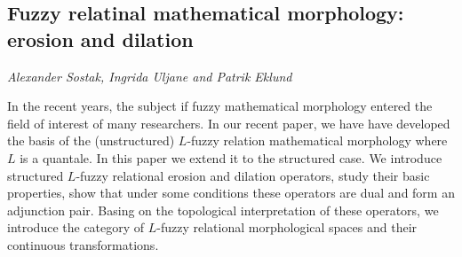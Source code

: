 \documentclass[../booklet.tex]{subfiles}
\begin{document}
\subsection[Fuzzy relatinal mathematical morphology: erosion and dilation. {\it Alexander Sostak, Ingrida Uljane and Patrik Eklund}]{Fuzzy relatinal mathematical morphology: erosion and dilation}
  

\begin{center}
  {\it Alexander Sostak, Ingrida Uljane and Patrik Eklund}
\end{center}

\vskip 0.8cm

 In the recent years, the subject if fuzzy mathematical morphology entered the field of interest of many researchers. In our recent paper, we have have developed the basis of the (unstructured) $L$-fuzzy relation mathematical morphology where $L$ is a quantale. In this paper we extend  it to the structured case. We introduce structured $L$-fuzzy relational erosion and dilation operators, study their basic properties, show that under some conditions  these operators are dual and form an adjunction pair. Basing on the topological interpretation of these operators, we introduce the category of  $L$-fuzzy relational morphological spaces and their continuous transformations. 


\end{document}
